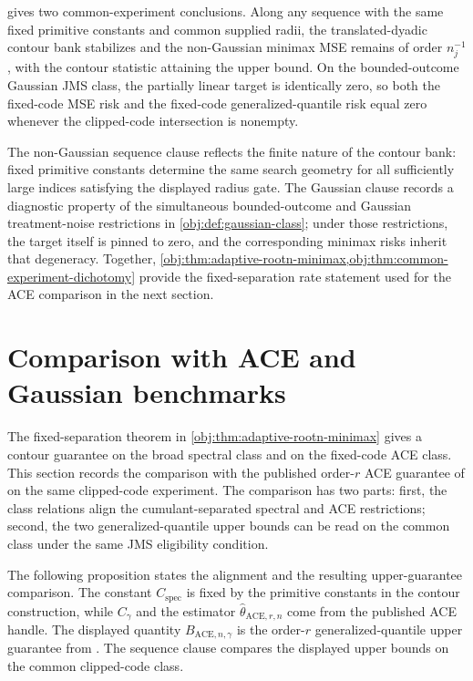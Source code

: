 \documentclass[11pt]{article}
\begin{document}
 gives two common-experiment conclusions. Along any sequence with the same fixed primitive constants and common supplied radii, the translated-dyadic contour bank stabilizes and the non-Gaussian minimax MSE remains of order \(n_j^{-1}\), with the contour statistic attaining the upper bound. On the bounded-outcome Gaussian JMS class, the partially linear target is identically zero, so both the fixed-code MSE risk and the fixed-code generalized-quantile risk equal zero whenever the clipped-code intersection is nonempty.

The non-Gaussian sequence clause reflects the finite nature of the contour bank: fixed primitive constants determine the same search geometry for all sufficiently large indices satisfying the displayed radius gate. The Gaussian clause records a diagnostic property of the simultaneous bounded-outcome and Gaussian treatment-noise restrictions in \cref{obj:def:gaussian-class}; under those restrictions, the target itself is pinned to zero, and the corresponding minimax risks inherit that degeneracy. Together, \cref{obj:thm:adaptive-rootn-minimax,obj:thm:common-experiment-dichotomy} provide the fixed-separation rate statement used for the ACE comparison in the next section.


\section{Comparison with ACE and Gaussian benchmarks}

The fixed-separation theorem in \cref{obj:thm:adaptive-rootn-minimax} gives a contour guarantee on the broad spectral class and on the fixed-code ACE class. This section records the comparison with the published order-\(r\) ACE guarantee of \citet{JinMackeySyrgkanis2025} on the same clipped-code experiment. The comparison has two parts: first, the class relations align the cumulant-separated spectral and ACE restrictions; second, the two generalized-quantile upper bounds can be read on the common class under the same JMS eligibility condition.

The following proposition states the alignment and the resulting upper-guarantee comparison. The constant \(C_{\mathrm{spec}}\) is fixed by the primitive constants in the contour construction, while \(C_{\gamma}\) and the estimator \(\widehat\theta_{\mathrm{ACE},r,n}\) come from the published ACE handle. The displayed quantity \(B_{\mathrm{ACE},n,\gamma}\) is the order-\(r\) generalized-quantile upper guarantee from \citet{JinMackeySyrgkanis2025}. The sequence clause compares the displayed upper bounds on the common clipped-code class.
\end{document}
